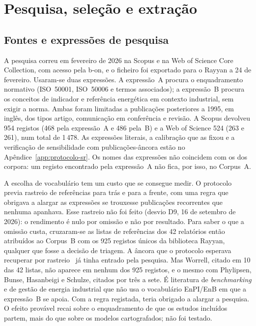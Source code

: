 


\section{Pesquisa, seleção e extração}
\label{sec:pesquisa}

\subsection{Fontes e expressões de pesquisa}

A pesquisa correu em fevereiro de 2026 na Scopus e na Web of Science Core
Collection, com acesso pela b-on, e o ficheiro foi exportado para o Rayyan
a 24 de fevereiro. Usaram-se duas expressões. A expressão~A procura o
enquadramento normativo (ISO~50001, ISO~50006 e termos associados); a
expressão~B procura os conceitos de indicador e referência energética em
contexto industrial, sem exigir a norma. Ambas foram limitadas a publicações
posteriores a 1995, em inglês, dos tipos artigo, comunicação em conferência
e revisão. A Scopus devolveu 954 registos (468 pela expressão~A e 486 pela~B)
e a Web of Science 524 (263 e 261), num total de 1\,478. As expressões
literais, a calibração que as fixou e a verificação de sensibilidade com
publicações-âncora estão no Apêndice~\ref{app:protocolo-sr}. Os nomes das
expressões não coincidem com os dos corpora: um registo encontrado pela
expressão~A não fica, por isso, no Corpus~A.

A escolha de vocabulário tem um custo que se consegue medir. O protocolo
previa rastreio de referências para trás e para a frente, com uma regra que obrigava a alargar as expressões se trouxesse
publicações recorrentes que nenhuma apanhava. Esse rastreio não foi feito (desvio D9, 16 de setembro de 2026):
o rendimento é nulo por omissão e não por resultado. Para saber o que a
omissão custa, cruzaram-se as listas de referências dos 42 relatórios então
atribuídos ao Corpus~B com os 925 registos únicos da biblioteca Rayyan,
qualquer que fosse a decisão de triagem. A âncora que o protocolo esperava
recuperar por rastreio~\cite{Karcher2015} já tinha entrado pela pesquisa.
Mas Worrell, citado em 10 das 42 listas, não aparece em nenhum dos 925
registos, e o mesmo com Phylipsen, Bunse, Hasanbeigi e Schulze, citados por três
a sete. É literatura de \emph{benchmarking} e de
gestão de energia industrial que não usa o vocabulário EnPI/EnB em que a
expressão~B se apoia. Com a regra registada, teria obrigado a alargar a pesquisa. O efeito provável recai sobre o enquadramento de que
os estudos incluídos partem, mais do que sobre os modelos cartografados;
não foi testado.


